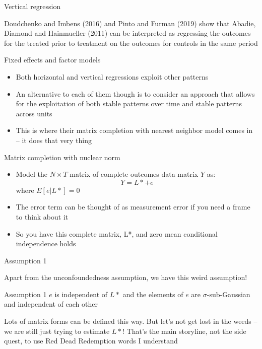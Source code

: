 \documentclass{beamer}
\begin{document}
\begin{frame}{Vertical regression}

Doudchenko and Imbens (2016) and Pinto and Furman (2019) show that Abadie, Diamond and Hainmueller (2011) can be interpreted as regressing the outcomes for the treated prior to treatment on the outcomes for controls in the same period

\end{frame}

\begin{frame}{Fixed effects and factor models}

\begin{itemize}
\item Both horizontal and vertical regressions exploit other patterns
\item An alternative to each of them though is to consider an approach that allows for the exploitation of both stable patterns over time and stable patterns across units
\item This is where their matrix completion with nearest neighbor model comes in -- it does that very thing
\end{itemize}

\end{frame}

\begin{frame}{Matrix completion with nuclear norm}

\begin{itemize}
\item Model the $N \times T$ matrix of complete outcomes data matrix $Y$ as: $$Y = L* + e$$where $E[e|L*]=0$
\item The error term can be thought of as measurement error if you need a frame to think about it
\item So you have this complete matrix, L*, and zero mean conditional independence holds
\end{itemize}

\end{frame}

\begin{frame}{Assumption 1}

Apart from the unconfoundedness assumption, we have this weird assumption!

\begin{block}{Assumption 1}
$e$ is independent of $L*$ and the elements of $e$ are $\sigma$-sub-Gaussian and independent of each other
\end{block}

Lots of matrix forms can be defined this way.  But let's not get lost in the weeds -- we are still just trying to estimate $L*$!  That's the main storyline, not the side quest, to use Red Dead Redemption words I understand

\end{frame}
\end{document}

